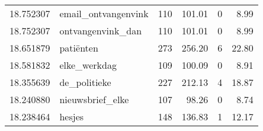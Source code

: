 \begin{table}[]
\begin{tabular}{rlrrrr}
     18.752307 &   email\_ontvangenvink &               110 &             101.01 &                 0 &               8.99 \\
     18.752307 &     ontvangenvink\_dan &               110 &             101.01 &                 0 &               8.99 \\
     18.651879 &             patiënten &               273 &             256.20 &                 6 &              22.80 \\
     18.581832 &          elke\_werkdag &               109 &             100.09 &                 0 &               8.91 \\
     18.355639 &          de\_politieke &               227 &             212.13 &                 4 &              18.87 \\
     18.240880 &      nieuwsbrief\_elke &               107 &              98.26 &                 0 &               8.74 \\
     18.238464 &                hesjes &               148 &             136.83 &                 1 &              12.17 \\
\bottomrule
\end{tabular}
\end{table}